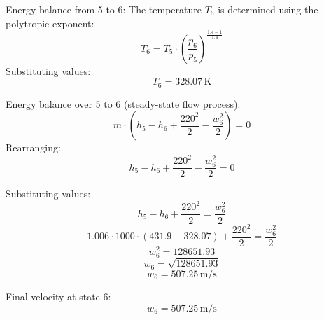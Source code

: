 Energy balance from 5 to 6:  
The temperature \( T_6 \) is determined using the polytropic exponent:  
\[ T_6 = T_5 \cdot \left( \frac{p_6}{p_5} \right)^{\frac{1.4 - 1}{1.4}} \]  
Substituting values:  
\[ T_6 = 328.07 \, \text{K} \]  

Energy balance over 5 to 6 (steady-state flow process):  
\[ m \cdot (h_5 - h_6 + \frac{220^2}{2} - \frac{w_6^2}{2}) = 0 \]  
Rearranging:  
\[ h_5 - h_6 + \frac{220^2}{2} - \frac{w_6^2}{2} = 0 \]  

Substituting values:  
\[ h_5 - h_6 + \frac{220^2}{2} = \frac{w_6^2}{2} \]  
\[ 1.006 \cdot 1000 \cdot (431.9 - 328.07) + \frac{220^2}{2} = \frac{w_6^2}{2} \]  
\[ w_6^2 = 128651.93 \]  
\[ w_6 = \sqrt{128651.93} \]  
\[ w_6 = 507.25 \, \text{m/s} \]  

Final velocity at state 6:  
\[ w_6 = 507.25 \, \text{m/s} \]